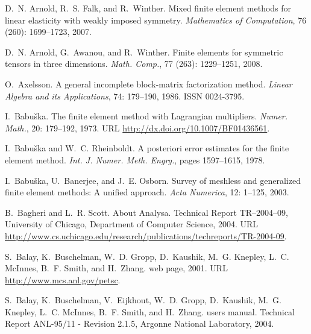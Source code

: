 \begin{thebibliography}{467}
D.~N. Arnold, R.~S. Falk, and R.~Winther.
\newblock Mixed finite element methods for linear elasticity with weakly
  imposed symmetry.
\newblock \emph{Mathematics of Computation}, 76 (260):
  1699--1723, 2007.

D.~N. Arnold, G.~Awanou, and R.~Winther.
\newblock Finite elements for symmetric tensors in three dimensions.
\newblock \emph{Math. Comp.}, 77 (263): 1229--1251, 2008.

O.~Axelsson.
\newblock A general incomplete block-matrix factorization method.
\newblock \emph{Linear Algebra and its Applications}, 74: 179--190,
  1986.
\newblock ISSN 0024-3795.

I.~Babu{\v{s}}ka.
\newblock The finite element method with {L}agrangian multipliers.
\newblock \emph{Numer. Math.}, 20: 179--192, 1973.
\newblock URL \url{http://dx.doi.org/10.1007/BF01436561}.

I.~Babu\v{s}ka and W.~C. Rheinboldt.
\newblock A posteriori error estimates for the finite element method.
\newblock \emph{Int. J. Numer. Meth. Engrg.}, pages 1597--1615, 1978.

I.~Babu\v{s}ka, U.~Banerjee, and J.~E. Osborn.
\newblock Survey of meshless and generalized finite element methods: {A}
  unified approach.
\newblock \emph{Acta Numerica}, 12: 1--125, 2003.

B.~Bagheri and L.~R. Scott.
\newblock About {A}nalysa.
\newblock Technical Report TR--2004--09, University of Chicago, Department of
  Computer Science, 2004.
\newblock URL
  \url{http://www.cs.uchicago.edu/research/publications/techreports/TR-2004-09}.

S.~Balay, K.~Buschelman, W.~D. Gropp, D.~Kaushik, M.~G. Knepley, L.~C. McInnes,
  B.~F. Smith, and H.~Zhang.
 web page, 2001.
\newblock URL \url{http://www.mcs.anl.gov/petsc}.

S.~Balay, K.~Buschelman, V.~Eijkhout, W.~D. Gropp, D.~Kaushik, M.~G. Knepley,
  L.~C. McInnes, B.~F. Smith, and H.~Zhang.
 users manual.
\newblock Technical Report ANL-95/11 - Revision 2.1.5, Argonne National
  Laboratory, 2004.


\end{thebibliography}
